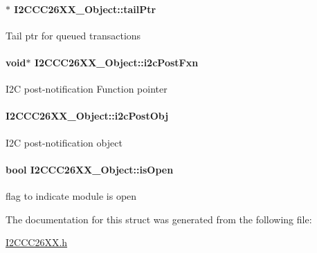 \paragraph[{tail\+Ptr}]{$\ast$ I2\+C\+C\+C26\+X\+X\+\_\+\+Object\+::tail\+Ptr}\label{struct_i2_c_c_c26_x_x___object_a6cd1216ab6faa1e951186dfe696f841b}
Tail ptr for queued transactions 
\paragraph[{i2c\+Post\+Fxn}]{\setlength{\rightskip}{0pt plus 5cm}void$\ast$ I2\+C\+C\+C26\+X\+X\+\_\+\+Object\+::i2c\+Post\+Fxn}\label{struct_i2_c_c_c26_x_x___object_a6a7aaccb2b2b05d9fd9230924acf9e96}
I2\+C post-\/notification Function pointer 
\paragraph[{i2c\+Post\+Obj}]{ I2\+C\+C\+C26\+X\+X\+\_\+\+Object\+::i2c\+Post\+Obj}\label{struct_i2_c_c_c26_x_x___object_a2b16c813ec8f21896de5eecf03ed4178}
I2\+C post-\/notification object 
\paragraph[{is\+Open}]{\setlength{\rightskip}{0pt plus 5cm}bool I2\+C\+C\+C26\+X\+X\+\_\+\+Object\+::is\+Open}\label{struct_i2_c_c_c26_x_x___object_a4c74297d4652d9f61558ca4099867686}
flag to indicate module is open 

The documentation for this struct was generated from the following file\+:\begin{DoxyCompactItemize}
\item 
\hyperlink{_i2_c_c_c26_x_x_8h}{I2\+C\+C\+C26\+X\+X.\+h}\end{DoxyCompactItemize}
